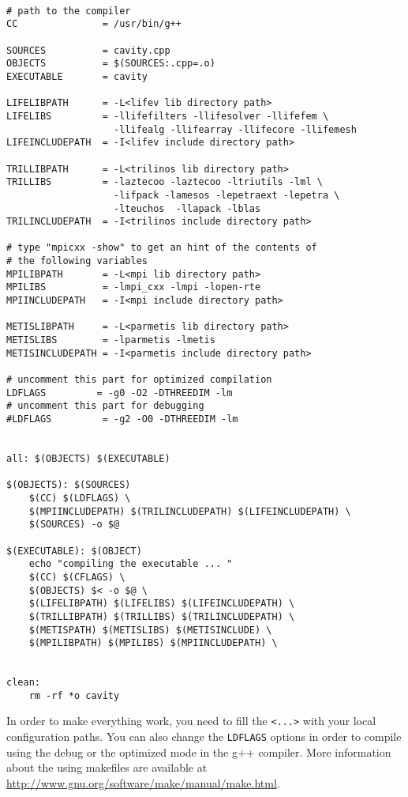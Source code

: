 \begin{verbatim}

# path to the compiler
CC               = /usr/bin/g++

SOURCES          = cavity.cpp
OBJECTS          = $(SOURCES:.cpp=.o)
EXECUTABLE       = cavity

LIFELIBPATH      = -L<lifev lib directory path>
LIFELIBS         = -llifefilters -llifesolver -llifefem \
                   -llifealg -llifearray -llifecore -llifemesh
LIFEINCLUDEPATH  = -I<lifev include directory path>

TRILLIBPATH      = -L<trilinos lib directory path>
TRILLIBS         = -laztecoo -laztecoo -ltriutils -lml \
                   -lifpack -lamesos -lepetraext -lepetra \
                   -lteuchos  -llapack -lblas
TRILINCLUDEPATH  = -I<trilinos include directory path>

# type "mpicxx -show" to get an hint of the contents of 
# the following variables
MPILIBPATH       = -L<mpi lib directory path>
MPILIBS          = -lmpi_cxx -lmpi -lopen-rte
MPIINCLUDEPATH   = -I<mpi include directory path>

METISLIBPATH	 = -L<parmetis lib directory path>
METISLIBS        = -lparmetis -lmetis
METISINCLUDEPATH = -I<parmetis include directory path>

# uncomment this part for optimized compilation
LDFLAGS         = -g0 -O2 -DTHREEDIM -lm
# uncomment this part for debugging
#LDFLAGS         = -g2 -O0 -DTHREEDIM -lm


all: $(OBJECTS) $(EXECUTABLE)

$(OBJECTS): $(SOURCES)
	$(CC) $(LDFLAGS) \
	$(MPIINCLUDEPATH) $(TRILINCLUDEPATH) $(LIFEINCLUDEPATH) \
	$(SOURCES) -o $@

$(EXECUTABLE): $(OBJECT)
	echo "compiling the executable ... "
	$(CC) $(CFLAGS) \
	$(OBJECTS) $< -o $@ \
	$(LIFELIBPATH) $(LIFELIBS) $(LIFEINCLUDEPATH) \
	$(TRILLIBPATH) $(TRILLIBS) $(TRILINCLUDEPATH) \
	$(METISPATH) $(METISLIBS) $(METISINCLUDE) \
	$(MPILIBPATH) $(MPILIBS) $(MPIINCLUDEPATH) \


clean:
	rm -rf *o cavity

\end{verbatim}


In order to make everything work, you need to fill the \verb|<...>| with your local
configuration paths. You can also change the \verb|LDFLAGS| options in order to
compile using the debug or the optimized mode in the g++ compiler. More information
about the using makefiles are available at \url{http://www.gnu.org/software/make/manual/make.html}.


